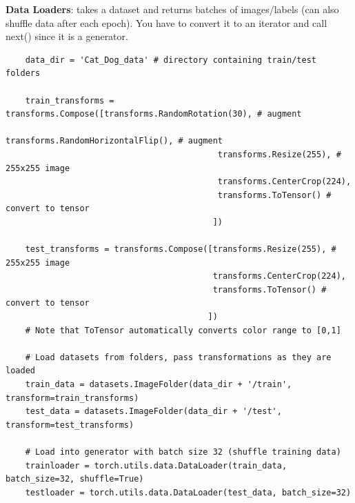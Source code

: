 \documentclass[11pt, a4paper]{article}
\begin{document}
\begin{spacing}{1.1}
	\noindent \textbf{Data Loaders}: takes a dataset and returns batches of images/labels (can also shuffle data after each epoch). You have to convert it to an iterator and call next() since it is a generator.
	\begin{lstlisting}
	data_dir = 'Cat_Dog_data' # directory containing train/test folders
	
	train_transforms = transforms.Compose([transforms.RandomRotation(30), # augment
	                                       transforms.RandomHorizontalFlip(), # augment
	                                       transforms.Resize(255), # 255x255 image
	                                       transforms.CenterCrop(224),
	                                       transforms.ToTensor() # convert to tensor
	                                      ])
	
	test_transforms = transforms.Compose([transforms.Resize(255), # 255x255 image
	                                      transforms.CenterCrop(224),
	                                      transforms.ToTensor() # convert to tensor
	                                     ])
	# Note that ToTensor automatically converts color range to [0,1]
	
	# Load datasets from folders, pass transformations as they are loaded
	train_data = datasets.ImageFolder(data_dir + '/train', transform=train_transforms)
	test_data = datasets.ImageFolder(data_dir + '/test', transform=test_transforms)
	
	# Load into generator with batch size 32 (shuffle training data)
	trainloader = torch.utils.data.DataLoader(train_data, batch_size=32, shuffle=True)
	testloader = torch.utils.data.DataLoader(test_data, batch_size=32)	
	\end{lstlisting} \vspace*{2mm}
	

\end{spacing}
\end{document}
